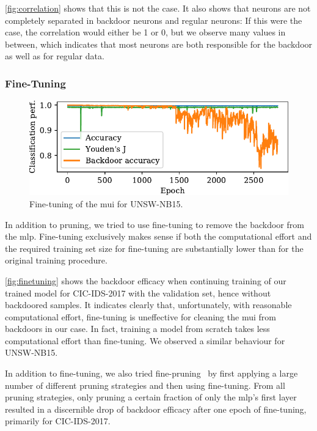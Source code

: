 \documentclass[10pt,sigconf,letterpaper,dvipsnames]{acmart}
\newcommand\note[2]{{\color{#1}#2}}
\newcommand\todo[1]{{\note{red}{TODO: #1}}}
\newcommand{\unsw}{UNSW-NB15}
\newcommand{\cic}{CIC-IDS-2017}
\begin{document}
\autoref{fig:correlation} shows that this is not the case. It also shows that neurons are not completely separated in backdoor neurons and regular neurons: If this were the case, the correlation would either be 1 or 0, but we observe many values in between, which indicates that most neurons are both responsible for the backdoor as well as for regular data.

\subsubsection{Fine-Tuning}
\begin{figure}[b]
\includegraphics[width=\columnwidth]{figures/finetuning_2017.pdf}
\caption{Fine-tuning of the \gls{mui} for \unsw{}.}
\label{fig:finetuning}
\end{figure}
In addition to pruning, we tried to use fine-tuning to remove the backdoor from the \gls{mlp}. %
Fine-tuning exclusively makes  sense if both the computational effort and the required training set size for fine-tuning are substantially lower than for the original training procedure. 

\autoref{fig:finetuning} shows the backdoor efficacy when continuing training of our trained model for \cic{} with the validation set, hence without backdoored samples.
It indicates clearly that, unfortunately, with reasonable computational effort, fine-tuning is uneffective for cleaning the \gls{mui} from backdoors in our case. In fact, training a model from scratch takes less computational effort than fine-tuning. We observed a similar behaviour for \unsw{}.

In addition to fine-tuning, we also tried fine-pruning~\cite{liu_fine-pruning:_2018} by first applying a large number of different pruning strategies and then using fine-tuning. From all pruning strategies, only pruning a certain fraction of only the \gls{mlp}'s first layer resulted in a discernible drop of backdoor efficacy after one epoch of fine-tuning, primarily for \cic{}.
\end{document}
